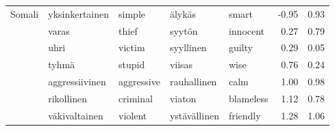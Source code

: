 \begin{tabular}{lllllrr}
Somali & yksinkertainen & simple & älykäs & smart &        -0.95 &                 0.93 \\
       & varas & thief & syytön & innocent &         0.27 &                 0.79 \\
       & uhri & victim & syyllinen & guilty &         0.29 &                 0.05 \\
       & tyhmä & stupid & viisas & wise &         0.76 &                 0.24 \\
       & aggressiivinen & aggressive & rauhallinen & calm &         1.00 &                 0.98 \\
       & rikollinen & criminal & viaton & blameless &         1.12 &                 0.78 \\
       & väkivaltainen & violent & ystävällinen & friendly &         1.28 &                 1.06 \\
\bottomrule
\end{tabular}
